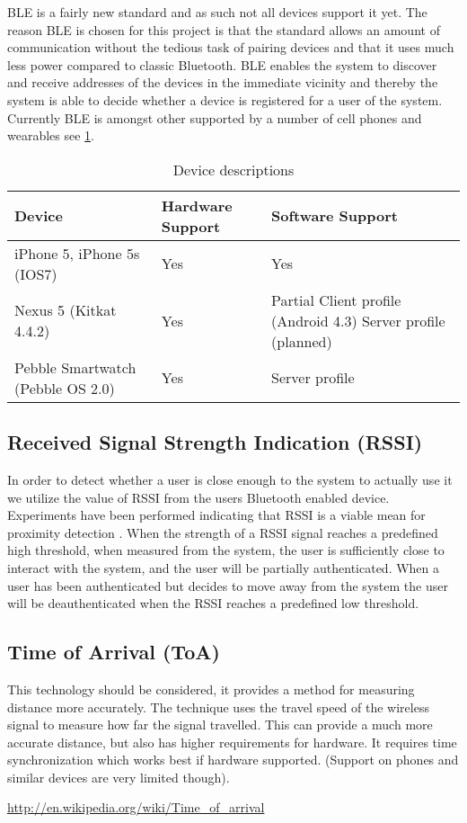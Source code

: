 BLE is a fairly new standard and as such not all devices support it yet.
The reason BLE is chosen for this project is that the standard allows an amount of communication without the tedious task of pairing devices and that it uses much less power compared to classic Bluetooth.
BLE enables the system to discover and receive addresses of the devices in the immediate vicinity and thereby the system is able to decide whether a device is registered for a user of the system.
Currently BLE is amongst other supported by a number of cell phones and wearables see \cref{table:devices}.

\begin{table}[!t]
\caption{Device descriptions}
\label{table:devices}
\centering
\begin{tabular}{|p{2.3cm}|p{1.3cm}|p{3.8cm}|}
\hline
\textbf{Device} & \textbf{Hardware Support} & \textbf{Software Support}\\
\hline
iPhone 5, iPhone 5s (IOS7) & Yes & Yes\\
\hline
Nexus 5 (Kitkat 4.4.2) & Yes & Partial \newline
Client profile (Android 4.3)
Server profile (planned)\\
\hline
Pebble Smartwatch (Pebble OS 2.0) & Yes & Server profile\\
\hline
\end{tabular}
\end{table}

\subsection{Received Signal Strength Indication (RSSI)}

In order to detect whether a user is close enough to the system to actually use it we utilize the value of RSSI from the users Bluetooth enabled device.
Experiments have been performed indicating that RSSI is a viable mean for proximity detection \cite{ref:Takashi}.
When the strength of a RSSI signal reaches a predefined high threshold, when measured from the system, the user is sufficiently close to interact with the system, and the user will be partially authenticated.
When a user has been authenticated but decides to move away from the system the user will be deauthenticated when the RSSI reaches a predefined low threshold.

\subsection{Time of Arrival (ToA)} %
This technology should be considered, it provides a method for measuring distance more accurately.
The technique uses the travel speed of the wireless signal to measure how far the signal travelled.
This can provide a much more accurate distance, but also has higher requirements for hardware.
It requires time synchronization which works best if hardware supported. (Support on phones and similar devices are very limited though). %

\url{http://en.wikipedia.org/wiki/Time_of_arrival}

